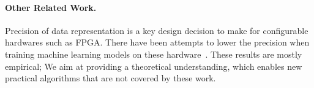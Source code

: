 \documentclass{article}
\renewcommand{\vec}[1]{\mathbf{#1}}
\def\a{{\bf a}}
\def\g{{\bf g}}
\def\x{{\bf x}}
\def\E{\mathbb{E}}
\begin{document}
\vspace{-1em}
\paragraph{Other Related Work.} Precision of data
representation is a key design decision to make
for configurable hardwares such as FPGA. There have
been attempts to
lower the precision when training machine learning models
on these hardware~\cite{Kim:2011:ICASSP}. 
These results are mostly empirical; We
aim at providing a theoretical understanding, which 
enables new practical algorithms that are not covered 
by these work.



\cleardoublepage







\end{document}
